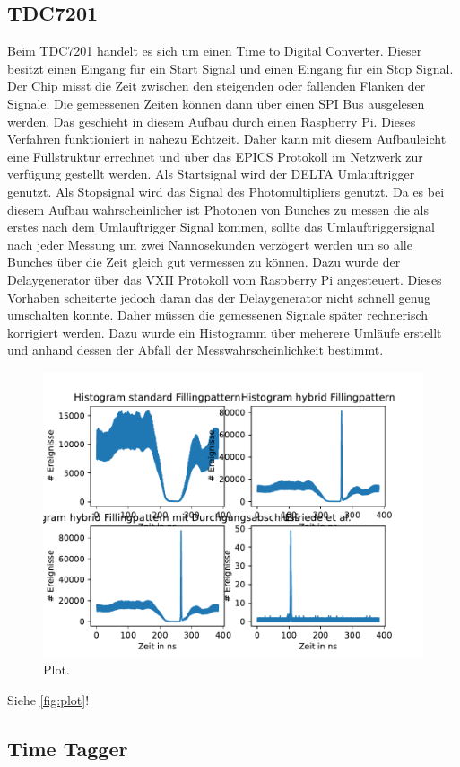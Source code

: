 \subsection{TDC7201}
\label{sec:TDC}
Beim TDC7201 handelt es sich um einen Time to Digital Converter. Dieser besitzt einen Eingang für ein 
Start Signal und einen Eingang für ein Stop Signal. Der Chip misst die Zeit zwischen den steigenden oder 
fallenden Flanken der Signale. Die gemessenen Zeiten können dann über einen SPI Bus ausgelesen werden.
Das geschieht in diesem Aufbau durch einen Raspberry Pi. Dieses Verfahren funktioniert in nahezu Echtzeit. 
Daher kann mit diesem Aufbauleicht eine Füllstruktur errechnet und über das EPICS Protokoll im Netzwerk 
zur verfügung gestellt werden. Als Startsignal wird der DELTA Umlauftrigger genutzt. Als Stopsignal wird 
das Signal des Photomultipliers genutzt. Da es bei diesem Aufbau wahrscheinlicher ist Photonen von Bunches 
zu messen die als erstes nach dem Umlauftrigger Signal kommen, sollte das Umlauftriggersignal nach jeder 
Messung um zwei Nannosekunden verzögert werden um so alle Bunches über die Zeit gleich gut vermessen zu können.
Dazu wurde der Delaygenerator über das VXII Protokoll vom Raspberry Pi angesteuert.
Dieses Vorhaben scheiterte jedoch daran das der Delaygenerator nicht schnell genug umschalten konnte.
Daher müssen die gemessenen Signale später rechnerisch korrigiert werden. Dazu wurde ein Histogramm über 
meherere Umläufe erstellt und anhand dessen der Abfall der Messwahrscheinlichkeit bestimmt.
\begin{figure}
  \centering
  \includegraphics{content/plots/multiplot1.pdf}
  \caption{Plot.}
  \label{fig:plot}
\end{figure}


Siehe \autoref{fig:plot}!


\subsection{Time Tagger}
\label{sec:TimeTagger}